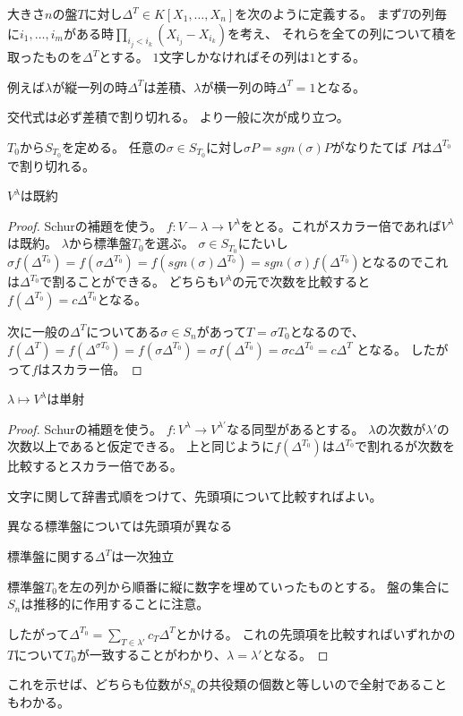 \documentclass{jsarticle}
\begin{document}
\begin{dfn}
大きさ$n$の盤$T$に対し$\Delta^T\in K[X_1,\ldots,X_n]$を次のように定義する。
まず$T$の列毎に$i_1,\ldots,i_m$がある時$\prod_{i_j<i_k}(X_{i_j}-X_{i_k})$を考え、
それらを全ての列について積を取ったものを$\Delta^T$とする。
$1$文字しかなければその列は$1$とする。
\end{dfn}
例えば$\lambda$が縦一列の時$\Delta^T$は差積、$\lambda$が横一列の時$\Delta^T=1$となる。

交代式は必ず差積で割り切れる。
より一般に次が成り立つ。
\begin{lem}
$T_0$から$S_{T_0}$を定める。
任意の$\sigma\in S_{T_0}$に対し$\sigma P=sgn(\sigma)P$がなりたてば
$P$は$\Delta^{T_0}$で割り切れる。
\end{lem}
\begin{lem}
$V^\lambda$は既約
\end{lem}
\begin{proof}
Schurの補題を使う。
$f:V-\lambda\to V^\lambda$をとる。これがスカラー倍であれば$V^\lambda$は既約。
$\lambda$から標準盤$T_0$を選ぶ。
$\sigma\in S_{T_0}$にたいし$\sigma f(\Delta^{T_0})=f(\sigma\Delta^{T_0})=f(sgn(\sigma)\Delta^{T_0})=sgn(\sigma)f(\Delta^{T_0})$となるのでこれは$\Delta^{T_0}$で割ることができる。
どちらも$V^\lambda$の元で次数を比較すると$f(\Delta^{T_0})=c\Delta^{T_0}$となる。

次に一般の$\Delta^T$についてある$\sigma\in S_n$があって$T=\sigma T_0$となるので、
$f(\Delta^T)=f(\Delta^{\sigma T_0})=f(\sigma\Delta^{T_0})=\sigma f(\Delta^{T_0})=\sigma c\Delta^{T_0}=c\Delta^{T}$
となる。
したがって$f$はスカラー倍。
\end{proof}

\begin{lem}
$\lambda\mapsto V^\lambda$は単射
\end{lem}
\begin{proof}
Schurの補題を使う。
$f:V^\lambda\to V^{\lambda'}$なる同型があるとする。
$\lambda$の次数が$\lambda'$の次数以上であると仮定できる。
上と同じように$f(\Delta^{T_0})$は$\Delta^{T_0}$で割れるが次数を比較するとスカラー倍である。


文字に関して辞書式順をつけて、先頭項について比較すればよい。
\begin{lem}
異なる標準盤については先頭項が異なる
\end{lem}

\begin{lem}
標準盤に関する$\Delta^T$は一次独立
\end{lem}

標準盤$T_0$を左の列から順番に縦に数字を埋めていったものとする。
盤の集合に$S_n$は推移的に作用することに注意。

したがって$\Delta^{T_0}=\sum_{T\in\lambda'}c_{T}\Delta^T$とかける。
これの先頭項を比較すればいずれかの$T$について$T_0$が一致することがわかり、$\lambda=\lambda'$となる。
\end{proof}
これを示せば、どちらも位数が$S_n$の共役類の個数と等しいので全射であることもわかる。
\end{document}
